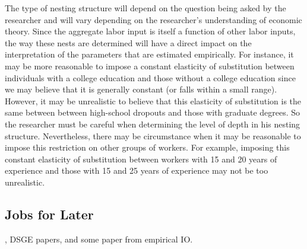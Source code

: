 \begin{flushleft}
The type of nesting structure will depend on the question being asked by the researcher and will vary depending on the researcher's understanding of economic theory.  Since the aggregate labor input is itself a function of other labor inputs, the way these nests are determined will have a direct impact on the interpretation of the parameters that are estimated empirically.  For instance, it may be more reasonable to impose a constant elasticity of substitution between individuals with a college education and those without a college education since we may believe that it is generally constant (or falls within a small range).  However, it may be unrealistic to believe that this elasticity of substitution is the same between between high-school dropouts and those with graduate degrees.  So the researcher must be careful when determining the level of depth in his nesting structure.  Nevertheless, there may be circumstance when it may be reasonable to impose this restriction on other groups of workers.  For example, imposing this constant elasticity of substitution between workers with 15 and 20 years of experience and those with 15 and 25 years of experience may not be too unrealistic.
\end{flushleft}

\subsection{Jobs for Later}
\cite{ACMS1961}, DSGE papers, and some paper from empirical IO.
